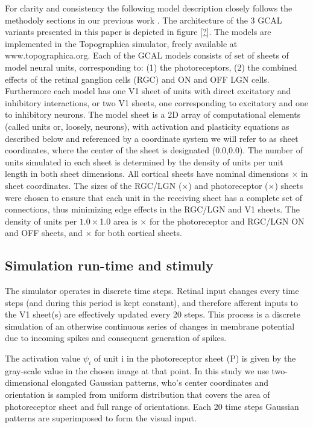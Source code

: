 \documentclass[a4paper,10pt]{article}
\begin{document}
For clarity and consistency the following model description closely follows the methodoly sections in our 
previous work \cite{Stevens2013,Antolik2011}. The architecture of the 3 GCAL variants presented in this 
paper is depicted in figure \ref{?}. The models are implemented in the Topographica simulator, freely available at www.topographica.org. 
Each of the GCAL models consists of set of sheets of model neural units,
corresponding to: (1) the photoreceptors, (2) the combined effects of the retinal ganglion cells (RGC) and ON and OFF LGN cells.
Furthermore each model has one V1 sheet of units with direct excitatory and inhibitory interactions, or two 
V1 sheets, one corresponding to excitatory and one to inhibitory neurons.
The model sheet is a 2D array of computational elements (called units or, loosely, neurons), with activation and plasticity equations as described below
and referenced by a coordinate system we will refer to as sheet coordinates, where the center of the sheet is designated (0.0,0.0).  
The number of units simulated in each sheet is determined by the density of units per unit length in both sheet dimensions. 
All cortical sheets have nominal dimensions $\times$ in sheet coordinates. The sizes of the
RGC/LGN ($\times$) and photoreceptor ($\times$) sheets
were chosen to ensure that each unit in the receiving sheet has a complete set of connections, thus minimizing edge effects in the
RGC/LGN and V1 sheets. The density of units per $1.0\times$1.0 area is $\times$ 
for the photoreceptor and RGC/LGN ON and OFF sheets, and $\times$ for both cortical sheets.

\subsection{Simulation run-time and stimuly}

The simulator operates in discrete time steps. Retinal input changes every  time steps (and during this period is kept constant), and
therefore afferent inputs to the V1 sheet(s) are effectively updated every 20 steps. This process is a discrete simulation of an
otherwise continuous series of changes in membrane potential due to incoming spikes and consequent generation of spikes.

The activation value $\psi_{i}$ of unit i in the photoreceptor sheet (P) is given by the gray-scale value in the chosen image at that point.
In this study we use two-dimensional elongated Gaussian patterns, who's center coordinates and orientation is sampled from uniform 
distribution that covers the area of photoreceptor sheet and full range of orientations. Each 20 time steps \insval Gaussian patterns are superimposed
to form the visual input.
\end{document}
